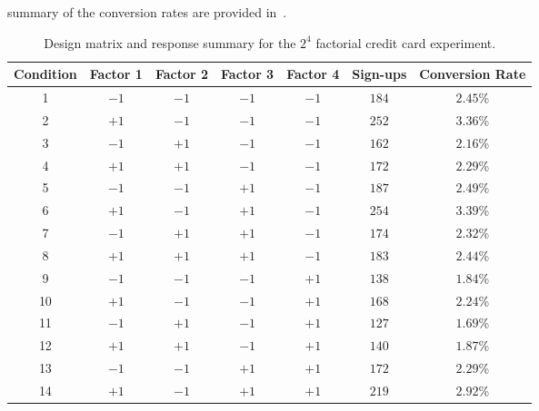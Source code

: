 \begin{itemize}
            summary of the conversion rates are provided in~.
            \begin{table}[!htbp]
                  \centering
                  \caption{Design matrix and response summary for the $2^4$ factorial credit card experiment.}\label{tab:creditcard2}
                  \begin{tabular}{ccccccc}
                        \toprule
                        Condition & Factor 1 & Factor 2 & Factor 3 & Factor 4 & Sign-ups & Conversion Rate \\
                        \midrule
                        1         & $-1$     & $-1$     & $-1$     & $-1$     & $184$    & $2.45$\%        \\
                        2         & $+1$     & $-1$     & $-1$     & $-1$     & $252$    & $3.36$\%        \\
                        3         & $-1$     & $+1$     & $-1$     & $-1$     & $162$    & $2.16$\%        \\
                        4         & $+1$     & $+1$     & $-1$     & $-1$     & $172$    & $2.29$\%        \\
                        5         & $-1$     & $-1$     & $+1$     & $-1$     & $187$    & $2.49$\%        \\
                        6         & $+1$     & $-1$     & $+1$     & $-1$     & $254$    & $3.39$\%        \\
                        7         & $-1$     & $+1$     & $+1$     & $-1$     & $174$    & $2.32$\%        \\
                        8         & $+1$     & $+1$     & $+1$     & $-1$     & $183$    & $2.44$\%        \\
                        9         & $-1$     & $-1$     & $-1$     & $+1$     & $138$    & $1.84$\%        \\
                        10        & $+1$     & $-1$     & $-1$     & $+1$     & $168$    & $2.24$\%        \\
                        11        & $-1$     & $+1$     & $-1$     & $+1$     & $127$    & $1.69$\%        \\
                        12        & $+1$     & $+1$     & $-1$     & $+1$     & $140$    & $1.87$\%        \\
                        13        & $-1$     & $-1$     & $+1$     & $+1$     & $172$    & $2.29$\%        \\
                        14        & $+1$     & $-1$     & $+1$     & $+1$     & $219$    & $2.92$\%        \\

\end{tabular}
\end{table}
\end{itemize}
